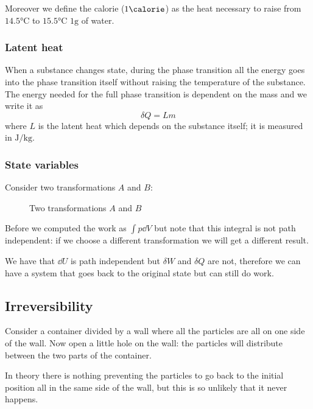 \documentclass[12pt]{extarticle}
\begin{document}
Moreover we define the calorie ($1 \si{\calorie}$) as the heat necessary to raise from $14.5 \si{\celsius}$ to $15.5 \si{\celsius}$ $1 \si{\gram}$ of water.

\subsubsection{Latent heat}
When a substance changes state, during the phase transition all the energy goes into the phase transition itself without raising the temperature of the substance.
The energy needed for the full phase transition is dependent on the mass and we write it as
\begin{equation}
    \delta Q = L m
\end{equation}
where $L$ is the latent heat which depends on the substance itself; it is measured in $\si{\joule \per \kilogram}$.

\subsubsection{State variables}

Consider two transformations $A$ and $B$:
\begin{figure}[H]
    \centering
    {
        \virgil
        
    }
    \caption{Two transformations $A$ and $B$}
\end{figure}

Before we computed the work as $\int p \dd{V}$ but note that this integral is not path independent: if we choose a different transformation we will get a different result.

We have that $\dd{U}$ is path independent but $\delta W$ and $\delta Q$ are not, therefore we can have a system that goes back to the original state but can still do work.

\subsection{Irreversibility}

Consider a container divided by a wall where all the particles are all on one side of the wall. Now open a little hole on the wall: the particles will distribute between the two parts of the container.

In theory there is nothing preventing the particles to go back to the initial position all in the same side of the wall, but this is so unlikely that it never happens.
\end{document}
